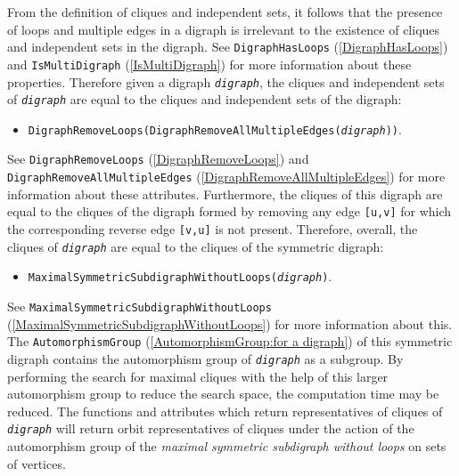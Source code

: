 \documentclass[a4paper,11pt]{report}
\begin{document}
{ From the definition of cliques and independent sets, it follows that the
presence of loops and multiple edges in a digraph is irrelevant to the
existence of cliques and independent sets in the digraph. See \texttt{DigraphHasLoops} (\ref{DigraphHasLoops}) and \texttt{IsMultiDigraph} (\ref{IsMultiDigraph}) for more information about these properties. Therefore given a digraph \mbox{\texttt{\mdseries\slshape digraph}}, the cliques and independent sets of \mbox{\texttt{\mdseries\slshape digraph}} are equal to the cliques and independent sets of the digraph: 
\begin{itemize}
\item  \texttt{DigraphRemoveLoops(DigraphRemoveAllMultipleEdges(}\mbox{\texttt{\mdseries\slshape digraph}}\texttt{))}. 
\end{itemize}
 See \texttt{DigraphRemoveLoops} (\ref{DigraphRemoveLoops}) and \texttt{DigraphRemoveAllMultipleEdges} (\ref{DigraphRemoveAllMultipleEdges}) for more information about these attributes. Furthermore, the cliques of this
digraph are equal to the cliques of the digraph formed by removing any edge \texttt{[u,v]} for which the corresponding reverse edge \texttt{[v,u]} is not present. Therefore, overall, the cliques of \mbox{\texttt{\mdseries\slshape digraph}} are equal to the cliques of the symmetric digraph: 
\begin{itemize}
\item  \texttt{MaximalSymmetricSubdigraphWithoutLoops(}\mbox{\texttt{\mdseries\slshape digraph}}\texttt{)}. 
\end{itemize}
 See \texttt{MaximalSymmetricSubdigraphWithoutLoops} (\ref{MaximalSymmetricSubdigraphWithoutLoops}) for more information about this. The \texttt{AutomorphismGroup} (\ref{AutomorphismGroup:for a digraph}) of this symmetric digraph contains the automorphism group of \mbox{\texttt{\mdseries\slshape digraph}} as a subgroup. By performing the search for maximal cliques with the help of
this larger automorphism group to reduce the search space, the computation
time may be reduced. The functions and attributes which return representatives
of cliques of \mbox{\texttt{\mdseries\slshape digraph}} will return orbit representatives of cliques under the action of the
automorphism group of the \emph{maximal symmetric subdigraph without loops} on sets of vertices.

}
\end{document}
